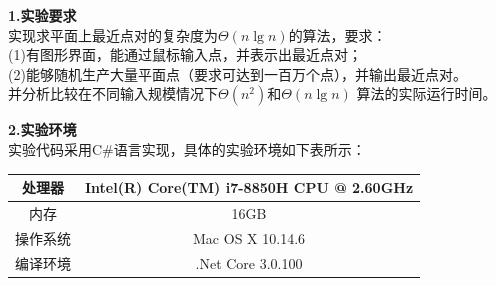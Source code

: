 \documentclass[a4paper]{article}
\begin{document}
\courseheader
{}

\info

\begin{enumerate}
  \setlength{\itemsep}{3\parskip}
  \textbf{1.实验要求}\\
  实现求平面上最近点对的复杂度为$\Theta(n\lg n)$的算法，要求：\\
  (1)有图形界面，能通过鼠标输入点，并表示出最近点对；\\
  (2)能够随机生产大量平面点（要求可达到一百万个点），并输出最近点对。\\
  并分析比较在不同输入规模情况下$\Theta(n^2)$和$\Theta(n\lg n)$
  算法的实际运行时间。\\  
  \bigskip

  \textbf{2.实验环境}\\
  实验代码采用C\#语言实现，具体的实验环境如下表所示：\\ \medskip
  \begin{tabular}{c|c}
    \hline\hline
    处理器 & Intel(R) Core(TM) i7-8850H CPU @ 2.60GHz \\ \hline
    内存 & 16GB\\ \hline
    操作系统& Mac OS X 10.14.6\\ \hline
    编译环境& .Net Core 3.0.100\\
    \hline\hline
  \end{tabular}\\
  \bigskip


\end{enumerate}
\end{document}
